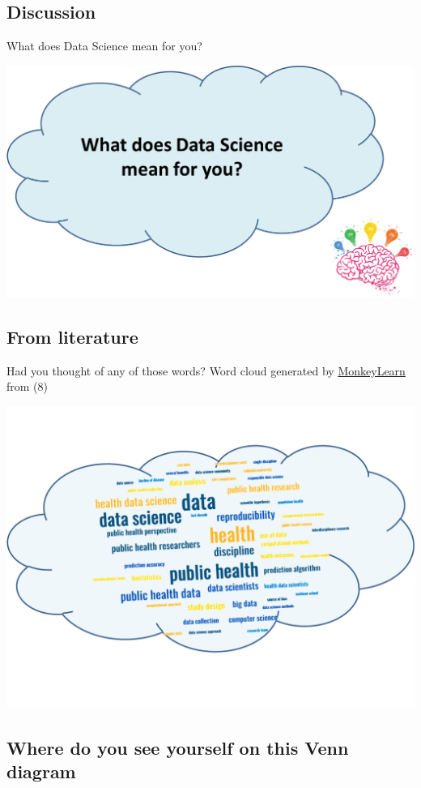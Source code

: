 \documentclass[
  letterpaper,
  DIV=11,
  numbers=noendperiod,
  oneside]{scrreprt}
\begin{document}
\subsection{\texorpdfstring{Discussion {💬}}{Discussion 💬}}

What does Data Science mean for you?

\includegraphics{images/paste-AC41DECB.png}

\subsection{From literature}

Had you thought of any of those words? Word cloud generated by
\href{https://monkeylearn.com/word-cloud/}{MonkeyLearn} from (8)

\includegraphics{images/paste-FFA998D0.png}

\hypertarget{where-do-you-see-yourself-on-this-venn-diagram}{%
\subsection{Where do you see yourself on this Venn
diagram}\label{where-do-you-see-yourself-on-this-venn-diagram}}
\end{document}
